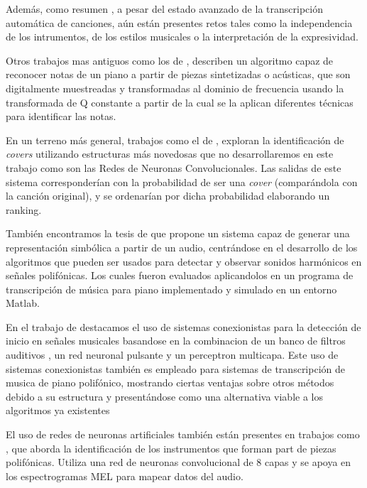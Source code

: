 \documentclass[12pt]{article}
\begin{document}
\bigskip
Además, como resumen \cite{benetos2018automatic},
a pesar del estado avanzado de la transcripción automática de canciones, aún están presentes retos tales como la independencia de los intrumentos, de los estilos
musicales o la interpretación de la expresividad.

\bigskip
Otros trabajos mas antiguos como los de \cite{foo1999recognition}, describen un algoritmo capaz de reconocer notas
de un piano a partir de piezas sintetizadas o acústicas, que son digitalmente muestreadas y transformadas al dominio de frecuencia usando 
la transformada de Q constante a partir de la cual se la aplican diferentes técnicas para identificar las notas.

\bigskip
En un terreno más general, trabajos como el de \cite{chang2017audio}, exploran la identificación de \textit{covers} utilizando
estructuras más novedosas que no desarrollaremos en este trabajo como son las Redes de Neuronas Convolucionales. Las salidas de este
sistema corresponderían con la probabilidad de ser una \textit{cover} (comparándola con la canción original), y se ordenarían por dicha 
probabilidad elaborando un ranking.

\bigskip
También encontramos la tesis de \cite{klapuri2004signal} que propone un sistema capaz de generar una representación 
simbólica a partir de un audio, centrándose en el desarrollo de los algoritmos que pueden ser usados para detectar y observar sonidos harmónicos en señales polifónicas.
Los cuales fueron evaluados aplicandolos en un programa de transcripción de música para piano implementado y simulado en un entorno Matlab.

\bigskip
En el trabajo de \cite{marolt2002neural} destacamos el uso de sistemas conexionistas para la detección de inicio en señales musicales basandose en la combinacion de un banco de filtros auditivos
, un red neuronal pulsante y un perceptron multicapa. Este uso de sistemas conexionistas también es empleado para sistemas de transcripción de musica de piano polifónico, mostrando ciertas ventajas sobre otros métodos debido a su estructura y 
presentándose como una alternativa viable a los algoritmos ya existentes

\bigskip
El uso de redes de neuronas artificiales también están presentes en trabajos como \cite{solanki2019music}, que aborda la identificación de
los instrumentos que forman part de piezas polifónicas. Utiliza una red de neuronas convolucional de 8 capas y se apoya en los espectrogramas 
MEL para mapear datos del audio.
\end{document}
